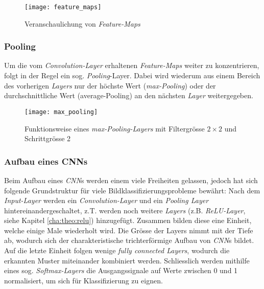 \begin{figure}[h]
	\centering
	\texttt{[image: feature\_maps]}
	\caption[\textit{Feature-Maps}]{Veranschaulichung von \textit{Feature-Maps}}
	\label{img:feature_maps}
\end{figure}

\subsubsection{Pooling}
Um die vom \textit{Convolution-Layer} erhaltenen \textit{Feature-Maps} weiter zu konzentrieren, folgt in der Regel ein sog. \textit{Pooling}-Layer. Dabei wird wiederum aus einem Bereich des vorherigen \textit{Layers} nur der höchste Wert (\textit{max-Pooling}) oder der durchschnittliche Wert (average-Pooling) an den nächsten \textit{Layer} weitergegeben.

\begin{figure}[h]
	\centering
	\texttt{[image: max\_pooling]}
	\caption[\textit{\textit{max-Pooling-Layer}}]{Funktionsweise eines \textit{max-Pooling-Layers} mit Filtergrösse $2\times 2$ und Schrittgrösse 2}
	\label{img:max_pooling}
\end{figure}


\subsubsection{Aufbau eines CNNs}

Beim Aufbau eines \textit{CNN}s werden einem viele Freiheiten gelassen, jedoch hat sich folgende Grundstruktur für viele Bildklassifizierungsprobleme bewährt: Nach dem \textit{Input-Layer} werden ein \textit{Convolution-Layer} und ein \textit{Pooling Layer} hintereinandergeschaltet, z.T. werden noch weitere \textit{Layers} (z.B. \textit{ReLU-Layer}, siehe Kapitel \ref{cha:theo:relu}) hinzugefügt. Zusammen bilden diese eine Einheit, welche einige Male wiederholt wird. Die Grösse der Layers nimmt mit der Tiefe ab, wodurch sich der charakteristische trichterförmige Aufbau von \textit{CNN}s bildet. Auf die letzte Einheit folgen wenige \textit{fully connected Layers}, wodurch die erkannten Muster miteinander kombiniert werden. Schliesslich werden mithilfe eines sog. \textit{Softmax-Layers} die Ausgangssignale auf Werte zwischen 0 und 1 normalisiert, um sich für Klassifizierung zu eignen.



